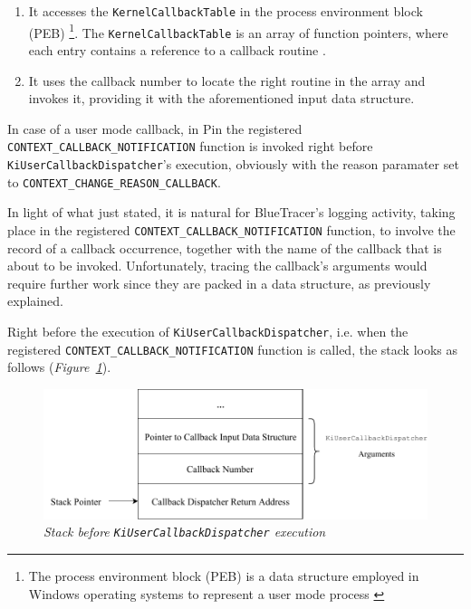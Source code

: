 \begin{enumerate}
\item It accesses the \texttt{KernelCallbackTable} in the process environment block \\ (PEB) \footnote{The process environment block (PEB) is a data structure employed in Windows operating systems to represent a user mode process \cite{KCT}}. The \texttt{KernelCallbackTable} is an array of function pointers, where each entry contains a reference to a callback routine \cite{KCT}.
\item It uses the callback number to locate the right routine in the array and invokes it, providing it with the aforementioned input data structure.   
\end{enumerate}

In case of a user mode callback, in Pin the registered \texttt{CONTEXT\_CALLBACK\_NOTIFICATION} function is invoked right before \texttt{KiUserCallbackDispatcher}'s execution, obviously with the reason paramater set to \texttt{CONTEXT\_CHANGE\_REASON\_CALLBACK}. 

In light of what just stated, it is natural for BlueTracer's logging activity, taking place in the registered \texttt{CONTEXT\_CALLBACK\_NOTIFICATION} function, to involve the record of a callback occurrence, together with the name of the callback that is about to be invoked. Unfortunately, tracing the callback's arguments would require further work since they are packed in a data structure, as previously explained.

Right before the execution of \texttt{KiUserCallbackDispatcher}, i.e. when the registered \texttt{CONTEXT\_CALLBACK\_NOTIFICATION} function is called, the stack looks as follows (\textit{Figure~\ref{KiUserCallback}}).
\\
\begin{figure}[h]
\centering
\includegraphics[width=1\textwidth]{Figures/StackCallback.pdf}
\caption{\textit{Stack before \texttt{KiUserCallbackDispatcher} execution}}
\label{KiUserCallback}
\end{figure}

